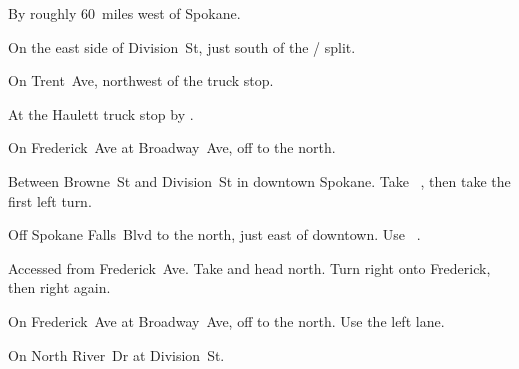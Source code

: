
\begin{LocationList}

By  roughly 60~miles west of Spokane. %

On the east side of Division~St, just south of the  /  split.

\Location{\GarageHQ \Garage}
On Trent~Ave, northwest of the truck stop.

At the Haulett truck stop by  .

On Frederick~Ave at Broadway~Ave, off   to the north.

Between Browne~St and Division~St in downtown Spokane.
Take~ , then take the first left turn.

Off Spokane Falls~Blvd to the north, just east of downtown.
Use~ .

Accessed from Frederick~Ave.
Take   and head north.
Turn right onto Frederick, then right again.

On Frederick~Ave at Broadway~Ave, off   to the north.
Use the left lane.

On North River~Dr at   Division~St.

\end{LocationList}
